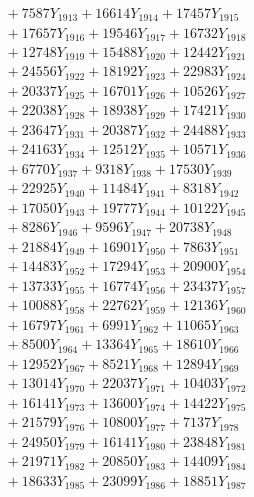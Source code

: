 \documentclass[a4paper,10pt]{article}
\begin{document}
{\begin{align}
&\;  + 7587 Y_{1913} + 16614 Y_{1914} + 17457 Y_{1915} \\[0.3ex]
&\;  + 17657 Y_{1916} + 19546 Y_{1917} + 16732 Y_{1918} \\[0.5ex]\allowbreak
&\;  + 12748 Y_{1919} + 15488 Y_{1920} + 12442 Y_{1921} \\[0.3ex]
&\;  + 24556 Y_{1922} + 18192 Y_{1923} + 22983 Y_{1924} \\[0.3ex]
&\;  + 20337 Y_{1925} + 16701 Y_{1926} + 10526 Y_{1927} \\[0.3ex]
&\;  + 22038 Y_{1928} + 18938 Y_{1929} + 17421 Y_{1930} \\[0.3ex]
&\;  + 23647 Y_{1931} + 20387 Y_{1932} + 24488 Y_{1933} \\[0.3ex]
&\;  + 24163 Y_{1934} + 12512 Y_{1935} + 10571 Y_{1936} \\[0.3ex]
&\;  + 6770 Y_{1937} + 9318 Y_{1938} + 17530 Y_{1939} \\[0.3ex]
&\;  + 22925 Y_{1940} + 11484 Y_{1941} + 8318 Y_{1942} \\[0.3ex]
&\;  + 17050 Y_{1943} + 19777 Y_{1944} + 10122 Y_{1945} \\[0.3ex]
&\;  + 8286 Y_{1946} + 9596 Y_{1947} + 20738 Y_{1948} \\[0.5ex]\allowbreak
&\;  + 21884 Y_{1949} + 16901 Y_{1950} + 7863 Y_{1951} \\[0.3ex]
&\;  + 14483 Y_{1952} + 17294 Y_{1953} + 20900 Y_{1954} \\[0.3ex]
&\;  + 13733 Y_{1955} + 16774 Y_{1956} + 23437 Y_{1957} \\[0.3ex]
&\;  + 10088 Y_{1958} + 22762 Y_{1959} + 12136 Y_{1960} \\[0.3ex]
&\;  + 16797 Y_{1961} + 6991 Y_{1962} + 11065 Y_{1963} \\[0.3ex]
&\;  + 8500 Y_{1964} + 13364 Y_{1965} + 18610 Y_{1966} \\[0.3ex]
&\;  + 12952 Y_{1967} + 8521 Y_{1968} + 12894 Y_{1969} \\[0.3ex]
&\;  + 13014 Y_{1970} + 22037 Y_{1971} + 10403 Y_{1972} \\[0.3ex]
&\;  + 16141 Y_{1973} + 13600 Y_{1974} + 14422 Y_{1975} \\[0.3ex]
&\;  + 21579 Y_{1976} + 10800 Y_{1977} + 7137 Y_{1978} \\[0.5ex]\allowbreak
&\;  + 24950 Y_{1979} + 16141 Y_{1980} + 23848 Y_{1981} \\[0.3ex]
&\;  + 21971 Y_{1982} + 20850 Y_{1983} + 14409 Y_{1984} \\[0.3ex]
&\;  + 18633 Y_{1985} + 23099 Y_{1986} + 18851 Y_{1987} \\[0.3ex]

\end{align}}
\end{document}
